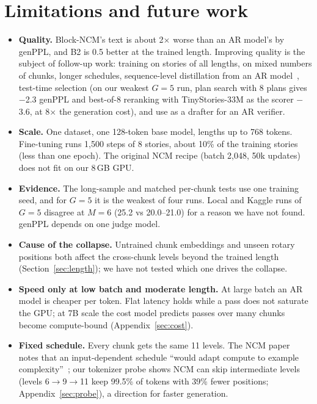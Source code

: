 \documentclass[10pt,twocolumn]{article}
\begin{document}
\section{Limitations and future work}
\label{sec:limits}

\begin{itemize}
  \item \textbf{Quality.} Block-NCM's text is about 2$\times$ worse than an AR model's by genPPL, and B2 is 0.5 better
        at the trained length. Improving quality is the subject of follow-up work: training on stories of all
        lengths, on mixed numbers of chunks, longer schedules, sequence-level distillation from an AR
        model~\cite{seqkd}, test-time selection (on our weakest $G{=}5$ run, plan search with 8 plans gives $-$2.3 genPPL and
        best-of-8 reranking with TinyStories-33M as the scorer $-$3.6, at 8$\times$ the generation cost), and use as a drafter for
        an AR verifier.
  \item \textbf{Scale.} One dataset, one 128-token base model, lengths up to 768 tokens. Fine-tuning runs 1,500
        steps of 8 stories, about 10\% of the training stories (less than one epoch). The original NCM recipe
        (batch 2,048, 50k updates) does not fit on our 8\,GB GPU.
  \item \textbf{Evidence.} The long-sample and matched per-chunk tests use one training seed, and for $G{=}5$ it is
        the weakest of four runs. Local and Kaggle runs of $G{=}5$ disagree at $M{=}6$ (25.2 vs 20.0--21.0) for a
        reason we have not found. genPPL depends on one judge model.
  \item \textbf{Cause of the collapse.} Untrained chunk embeddings and unseen rotary positions both affect the
        cross-chunk levels beyond the trained length (Section~\ref{sec:length}); we have not tested which one drives
        the collapse.
  \item \textbf{Speed only at low batch and moderate length.} At large batch an AR model is cheaper per token. Flat
        latency holds while a pass does not saturate the GPU; at 7B scale the cost model predicts passes over many
        chunks become compute-bound (Appendix~\ref{sec:cost}).
  \item \textbf{Fixed schedule.} Every chunk gets the same 11 levels. The NCM paper notes that an input-dependent
        schedule ``would adapt compute to example complexity''~\cite{ncm}; our tokenizer probe shows NCM can skip
        intermediate levels (levels 6$\to$9$\to$11 keep 99.5\% of tokens with 39\% fewer positions;
        Appendix~\ref{sec:probe}), a direction for faster generation.
\end{itemize}
\end{document}
